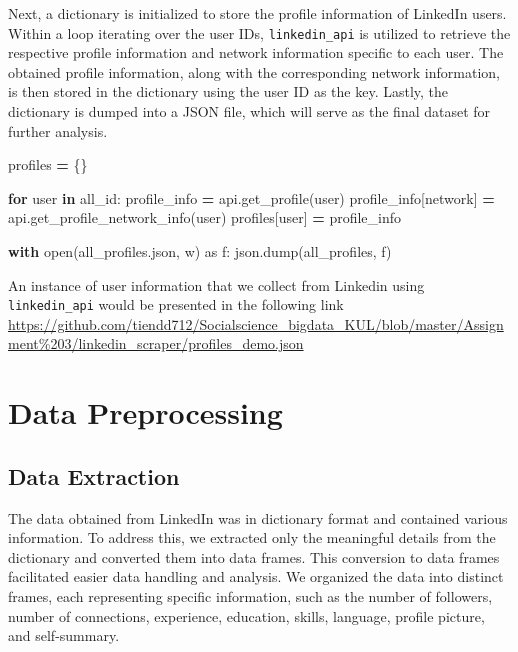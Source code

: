 \documentclass[11pt,]{article}
\newenvironment{Shaded}{\begin{snugshade}}{\end{snugshade}}
\newcommand{\BuiltInTok}[1]{#1}
\newcommand{\ControlFlowTok}[1]{\textcolor[rgb]{0.13,0.29,0.53}{\textbf{#1}}}
\newcommand{\ImportTok}[1]{#1}
\newcommand{\KeywordTok}[1]{\textcolor[rgb]{0.13,0.29,0.53}{\textbf{#1}}}
\newcommand{\NormalTok}[1]{#1}
\newcommand{\OperatorTok}[1]{\textcolor[rgb]{0.81,0.36,0.00}{\textbf{#1}}}
\newcommand{\StringTok}[1]{\textcolor[rgb]{0.31,0.60,0.02}{#1}}
\begin{document}
Next, a dictionary is initialized to store the profile information of
LinkedIn users. Within a loop iterating over the user IDs,
\texttt{linkedin\_api} is utilized to retrieve the respective profile
information and network information specific to each user. The obtained
profile information, along with the corresponding network information,
is then stored in the dictionary using the user ID as the key. Lastly,
the dictionary is dumped into a JSON file, which will serve as the final
dataset for further analysis.

\begin{Shaded}
\begin{Highlighting}[]
\NormalTok{profiles }\OperatorTok{=}\NormalTok{ \{\}}

\ControlFlowTok{for}\NormalTok{ user }\KeywordTok{in}\NormalTok{ all\_id:}
\NormalTok{    profile\_info }\OperatorTok{=}\NormalTok{ api.get\_profile(user)}
\NormalTok{    profile\_info[}\StringTok{\textquotesingle{}network\textquotesingle{}}\NormalTok{] }\OperatorTok{=}\NormalTok{ api.get\_profile\_network\_info(user)}
\NormalTok{    profiles[user] }\OperatorTok{=}\NormalTok{ profile\_info}

\ControlFlowTok{with} \BuiltInTok{open}\NormalTok{(}\StringTok{\textquotesingle{}all\_profiles.json\textquotesingle{}}\NormalTok{, }\StringTok{\textquotesingle{}w\textquotesingle{}}\NormalTok{) }\ImportTok{as}\NormalTok{ f:}
\NormalTok{    json.dump(all\_profiles, f)}
\end{Highlighting}
\end{Shaded}

An instance of user information that we collect from Linkedin using
\texttt{linkedin\_api} would be presented in the following link
\url{https://github.com/tiendd712/Socialscience_bigdata_KUL/blob/master/Assignment\%203/linkedin_scraper/profiles_demo.json}

\hypertarget{data-preprocessing}{%
\section{Data Preprocessing}\label{data-preprocessing}}

\hypertarget{data-extraction}{%
\subsection{Data Extraction}\label{data-extraction}}

The data obtained from LinkedIn was in dictionary format and contained
various information. To address this, we extracted only the meaningful
details from the dictionary and converted them into data frames. This
conversion to data frames facilitated easier data handling and analysis.
We organized the data into distinct frames, each representing specific
information, such as the number of followers, number of connections,
experience, education, skills, language, profile picture, and
self-summary.
\end{document}
